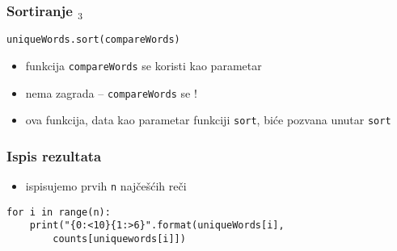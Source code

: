 \documentclass[utf8,compress]{beamer}
\begin{document}
\begin{frame}[fragile]
  \frametitle{Sortiranje $_3$}
\begin{verbatim}
uniqueWords.sort(compareWords)
\end{verbatim}
  \begin{itemize}
    \item funkcija \texttt{compareWords} se koristi kao parametar
    \item nema zagrada -- \texttt{compareWords} se !
    \item ova funkcija, data kao parametar funkciji \texttt{sort}, biće pozvana unutar \texttt{sort}
  \end{itemize}
\end{frame}

\begin{frame}[fragile]
  \frametitle{Ispis rezultata}
  \begin{itemize}
    \item ispisujemo prvih \texttt{n} najčešćih reči
  \end{itemize}
\begin{verbatim}
for i in range(n):
    print("{0:<10}{1:>6}".format(uniqueWords[i], 
        counts[uniquewords[i]])
\end{verbatim}
\end{frame}
\end{document}
